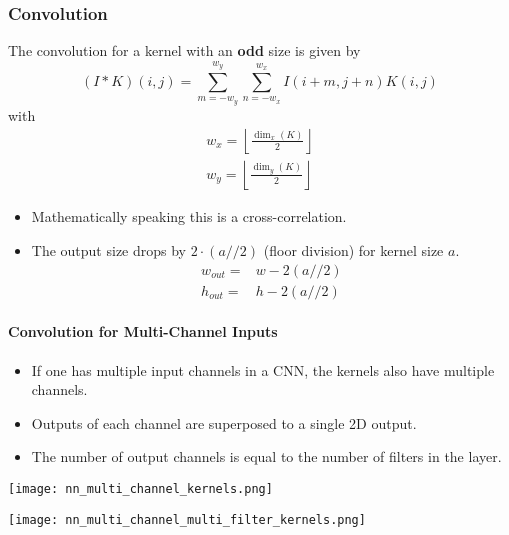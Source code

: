 \subsubsection{Convolution}
The convolution for a kernel with an \textbf{odd} size is given by
\begin{equation*}
    (I * K)(i,j) = \sum_{m=-w_y}^{w_y}\sum_{n=-w_x}^{w_x}I(i+m,j+n)K(i,j)
\end{equation*}
with
\begin{gather*}
    w_x = \left\lfloor \frac{\dim_x(K)}{2} \right\rfloor \\
    w_y = \left\lfloor \frac{\dim_y(K)}{2} \right\rfloor
\end{gather*}

\newpar{}
\begin{itemize}
    \item Mathematically speaking this is a cross-correlation.
    \item The output size drops by $2\cdot (a//2)$ (floor division) for kernel size $a$.
          \begin{align*}
              w_{out}= & w-2(a//2) \\
              h_{out}= & h-2(a//2)
          \end{align*}
\end{itemize}

\paragraph{Convolution for Multi-Channel Inputs}
\begin{itemize}
    \item If one has multiple input channels in a CNN, the kernels also have multiple channels.
    \item Outputs of each channel are superposed to a single 2D output.
    \item The number of output channels is equal to the number of filters in the layer.
\end{itemize}

\newpar{}
\begin{center}
    \texttt{[image: nn\_multi\_channel\_kernels.png]}
\end{center}

\newpar{}
\begin{center}
    \texttt{[image: nn\_multi\_channel\_multi\_filter\_kernels.png]}
\end{center}

